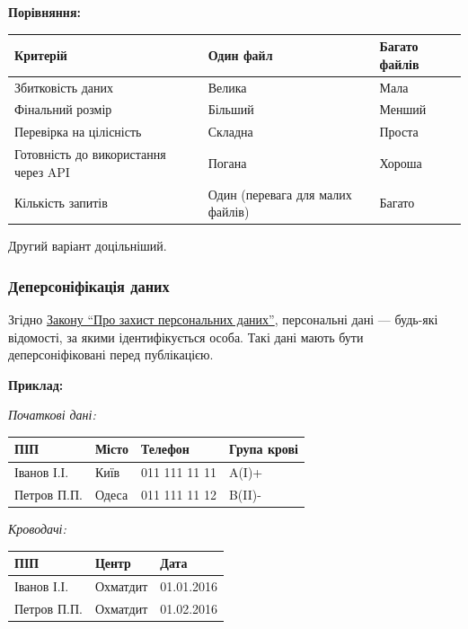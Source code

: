 \textbf{Порівняння:}

\begin{tabular}{|l|l|l|}
\hline
Критерій                           & Один файл                                                & Багато файлів                        \\
\hline
Збитковість даних                   & Велика                                                  & Мала                                 \\
Фінальний розмір                    & Більший                                                 & Менший                               \\
Перевірка на цілісність             & Складна                                                 & Проста                               \\
Готовність до використання через API & Погана                                                  & Хороша                               \\
Кількість запитів                   & Один (перевага для малих файлів)                        & Багато                               \\
\hline
\end{tabular}

Другий варіант доцільніший.

\subsubsection{Деперсоніфікація даних}

Згідно \href{http://zakon3.rada.gov.ua/laws/show/2297-17}{Закону “Про захист персональних даних”}, персональні дані — будь-які відомості, за якими ідентифікується особа. Такі дані мають бути деперсоніфіковані перед публікацією.

\textbf{Приклад:}

\textit{Початкові дані:}

\begin{tabular}{|l|l|l|l|}
\hline
ПІП         & Місто & Телефон      & Група крові \\
\hline
Іванов І.І. & Київ  & 011 111 11 11& A(I)+       \\
Петров П.П. & Одеса & 011 111 11 12& B(II)-      \\
\hline
\end{tabular}

\textit{Кроводачі:}

\begin{tabular}{|l|l|l|}
\hline
ПІП         & Центр    & Дата       \\
\hline
Іванов І.І. & Охматдит & 01.01.2016 \\
Петров П.П. & Охматдит & 01.02.2016 \\
\hline
\end{tabular}

